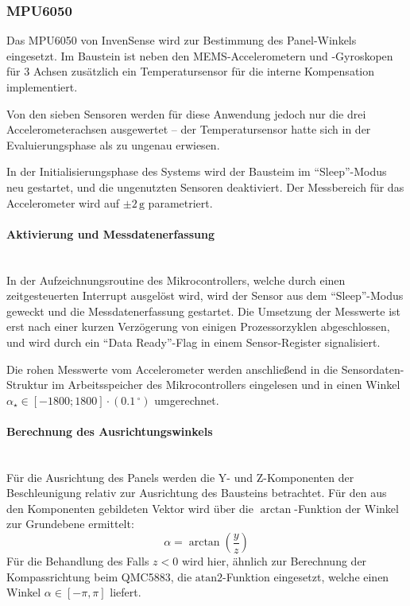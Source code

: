         \subsubsection{MPU6050}\label{ssec:MPU6050}
            Das MPU6050 von InvenSense wird zur Bestimmung des Panel-Winkels eingesetzt. Im Baustein ist neben den MEMS-Accelerometern und -Gyroskopen für 3 Achsen zusätzlich ein Temperatursensor für die interne Kompensation implementiert. 
            
            Von den sieben Sensoren werden für diese Anwendung jedoch nur die drei Accelerometerachsen ausgewertet -- der Temperatursensor hatte sich in der Evaluierungsphase als zu ungenau erwiesen.
            
            In der Initialisierungsphase des Systems wird der Bausteim im ``Sleep''-Modus neu gestartet, und die ungenutzten Sensoren deaktiviert. Der Messbereich für das Accelerometer wird auf $\pm2\,\mathrm{g}$ parametriert.
            
            \paragraph{Aktivierung und Messdatenerfassung}\mbox{}\\
            In der Aufzeichnungsroutine des Mikrocontrollers, welche durch einen zeitgesteuerten Interrupt ausgelöst wird, wird der Sensor aus dem ``Sleep''-Modus geweckt und die Messdatenerfassung gestartet. Die Umsetzung der Messwerte ist erst nach einer kurzen Verzögerung von einigen Prozessorzyklen abgeschlossen, und wird durch ein ``Data Ready''-Flag in einem Sensor-Register signalisiert.
            
            Die rohen Messwerte vom Accelerometer werden anschließend in die Sensordaten-Struktur im Arbeitsspeicher des Mikrocontrollers eingelesen und in einen Winkel $\alpha_\star \in [-1800; 1800] \cdot (0.1\,^\circ)$ umgerechnet.
            
            \paragraph{Berechnung des Ausrichtungswinkels}\mbox{}\\
            Für die Ausrichtung des Panels werden die Y- und Z-Komponenten der Beschleunigung relativ zur Ausrichtung des Bausteins betrachtet. Für den  aus den Komponenten gebildeten Vektor wird über die $\arctan$-Funktion der Winkel zur Grundebene ermittelt:
            \begin{equation*}
                \alpha = \arctan\left(\frac{y}{z}\right)
            \end{equation*}
            Für die Behandlung des Falls $z < 0$ wird hier, ähnlich zur Berechnung der Kompassrichtung beim QMC5883, die $\mathrm{atan2}$-Funktion eingesetzt, welche einen Winkel $\alpha \in [-\pi, \pi]$ liefert.
            
